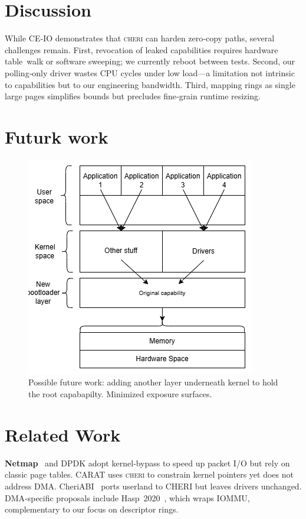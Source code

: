 \documentclass[sigconf]{acmart}
\newcommand{\cheri}{\textsc{cheri}\xspace}
\begin{document}
\section{Discussion}
\label{sec:discussion}
While CE‑IO demonstrates that \cheri can harden zero‑copy paths, several challenges remain. First, revocation of leaked capabilities requires hardware table walk or software sweeping; we currently reboot between tests. Second, our polling‑only driver wastes CPU cycles under low load—a limitation not intrinsic to capabilities but to our engineering bandwidth. Third, mapping rings as single large pages simplifies bounds but precludes fine‑grain runtime resizing.

\section{Futurk work}
\begin{figure}[t]
    \centering
    \includegraphics[width=0.9\columnwidth]{figures/future-work.drawio.png}
    \caption{Possible future work: adding another layer underneath kernel to hold the root capabapilty. Minimized exposure surfaces.}
    \label{fig:flow}
\end{figure}


\section{Related Work}
\label{sec:related}
\textbf{Netmap} \cite{rizzo2012netmap} and DPDK adopt kernel‑bypass to speed up packet I/O but rely on classic page tables. CARAT \cite{carat2023} uses \cheri to constrain kernel pointers yet does not address DMA. CheriABI \cite{watts2019cheriabi} ports userland to CHERI but leaves drivers unchanged. DMA‑specific proposals include Hasp 2020 \cite{cheridma2020}, which wraps IOMMU, complementary to our focus on descriptor rings.
\end{document}
